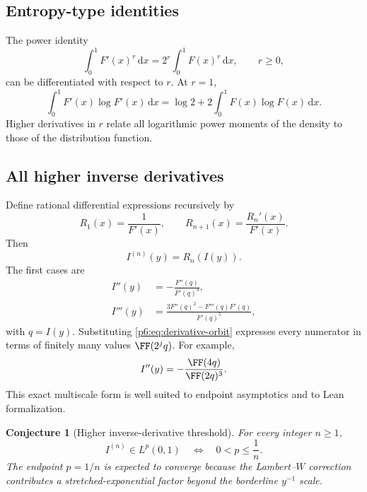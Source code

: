 \documentclass[11pt,oneside]{article}
\newtheorem{conjecture}[theorem]{Conjecture}
\theoremstyle{definition}
\theoremstyle{remark}
\newcommand{\dd}{\,\mathrm d}
\newcommand{\1}{\mathbf 1}
\begin{document}
\subsection{Entropy-type identities}

The power identity
\begin{equation}
 \int_0^1F'(x)^r\dd x=2^r\int_0^1F(x)^r\dd x,
 \qquad r\ge0,                                            \label{p6:eq:Fprime-power}
\end{equation}
can be differentiated with respect to \(r\).  At \(r=1\),
\begin{equation}
 \int_0^1F'(x)\log F'(x)\dd x
 =\log2+2\int_0^1F(x)\log F(x)\dd x.                    \label{p6:eq:entropy-identity}
\end{equation}
Higher derivatives in \(r\) relate all logarithmic power moments of the density to those
of the distribution function.

\subsection{All higher inverse derivatives}

Define rational differential expressions recursively by
\begin{equation}
 R_1(x)=\frac1{F'(x)},\qquad
 R_{n+1}(x)=\frac{R_n'(x)}{F'(x)}.                         \label{p6:eq:inverse-derivative-recursion}
\end{equation}
Then
\begin{equation}
 I^{(n)}(y)=R_n(I(y)).                                     \label{p6:eq:inverse-derivative-all}
\end{equation}
The first cases are
\begin{align}
 I''(y)&=-\frac{F''(q)}{F'(q)^3},                          \label{p6:eq:Isecond}\\
 I'''(y)&=\frac{3F''(q)^2-F'''(q)F'(q)}{F'(q)^5},          \label{p6:eq:Ithird}
\end{align}
with \(q=I(y)\).  Substituting \eqref{p6:eq:derivative-orbit} expresses every numerator
in terms of finitely many values \(\FF(2^jq)\).  For example,
\begin{equation}
 I''(y)=-\frac{\FF(4q)}{\FF(2q)^3}.                       \label{p6:eq:Isecond-scaled}
\end{equation}
This exact multiscale form is well suited to endpoint asymptotics and to Lean
formalization.

\begin{conjecture}[Higher inverse-derivative threshold]
\label{p6:conj:higher-inverse-Lp}
For every integer \(n\ge1\),
\begin{equation}
 I^{(n)}\in L^p(0,1)
 \quad\Longleftrightarrow\quad 0<p\le\frac1n.             \label{p6:eq:higher-I-threshold}
\end{equation}
The endpoint \(p=1/n\) is expected to converge because the Lambert--\(W\) correction
contributes a stretched-exponential factor beyond the borderline \(y^{-1}\) scale.
\end{conjecture}
\end{document}
